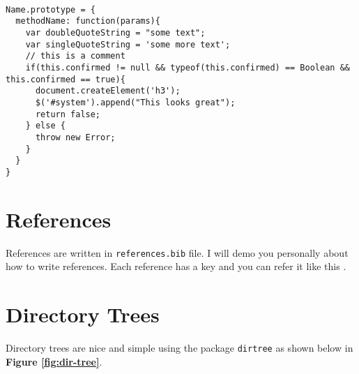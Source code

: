 \begin{listing}[H]
\begin{verbatim}

Name.prototype = {
  methodName: function(params){
    var doubleQuoteString = "some text";
    var singleQuoteString = 'some more text';
    // this is a comment
    if(this.confirmed != null && typeof(this.confirmed) == Boolean && this.confirmed == true){
      document.createElement('h3');
      $('#system').append("This looks great");
      return false;
    } else {
      throw new Error;
    }
  }
}

\end{verbatim}
\label{lst:label-for-listing}
\end{listing}

\section{References}
References are written in \texttt{references.bib} file. I will demo you personally about how to write references. Each reference has a key and you can refer it like this \cite{iansommerville2011}.\\


\section{Directory Trees}
\label{sec:dir-trees}

Directory trees are nice and simple using the package \texttt{dirtree} as shown below in \textbf{Figure \ref{fig:dir-tree}}.

\label{fig:dir-tree}

